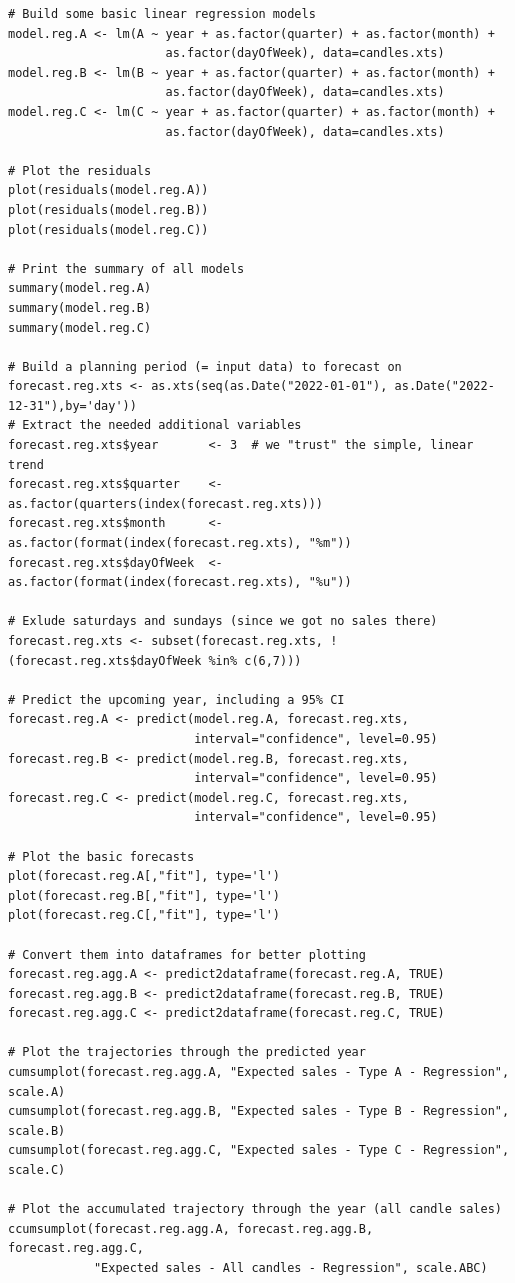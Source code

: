 \documentclass[a4paper,11pt]{article}
\begin{document}
\begin{lstlisting}
# Build some basic linear regression models
model.reg.A <- lm(A ~ year + as.factor(quarter) + as.factor(month) +
                      as.factor(dayOfWeek), data=candles.xts)
model.reg.B <- lm(B ~ year + as.factor(quarter) + as.factor(month) +
                      as.factor(dayOfWeek), data=candles.xts)
model.reg.C <- lm(C ~ year + as.factor(quarter) + as.factor(month) +
                      as.factor(dayOfWeek), data=candles.xts)

# Plot the residuals
plot(residuals(model.reg.A))
plot(residuals(model.reg.B))
plot(residuals(model.reg.C))

# Print the summary of all models
summary(model.reg.A)
summary(model.reg.B)
summary(model.reg.C)

# Build a planning period (= input data) to forecast on
forecast.reg.xts <- as.xts(seq(as.Date("2022-01-01"), as.Date("2022-12-31"),by='day'))
# Extract the needed additional variables
forecast.reg.xts$year       <- 3  # we "trust" the simple, linear trend
forecast.reg.xts$quarter    <- as.factor(quarters(index(forecast.reg.xts)))
forecast.reg.xts$month      <- as.factor(format(index(forecast.reg.xts), "%m"))
forecast.reg.xts$dayOfWeek  <- as.factor(format(index(forecast.reg.xts), "%u"))

# Exlude saturdays and sundays (since we got no sales there)
forecast.reg.xts <- subset(forecast.reg.xts, !(forecast.reg.xts$dayOfWeek %in% c(6,7)))

# Predict the upcoming year, including a 95% CI
forecast.reg.A <- predict(model.reg.A, forecast.reg.xts,
                          interval="confidence", level=0.95)
forecast.reg.B <- predict(model.reg.B, forecast.reg.xts,
                          interval="confidence", level=0.95)
forecast.reg.C <- predict(model.reg.C, forecast.reg.xts,
                          interval="confidence", level=0.95)

# Plot the basic forecasts
plot(forecast.reg.A[,"fit"], type='l')
plot(forecast.reg.B[,"fit"], type='l')
plot(forecast.reg.C[,"fit"], type='l')

# Convert them into dataframes for better plotting
forecast.reg.agg.A <- predict2dataframe(forecast.reg.A, TRUE)
forecast.reg.agg.B <- predict2dataframe(forecast.reg.B, TRUE)
forecast.reg.agg.C <- predict2dataframe(forecast.reg.C, TRUE)

# Plot the trajectories through the predicted year
cumsumplot(forecast.reg.agg.A, "Expected sales - Type A - Regression", scale.A)
cumsumplot(forecast.reg.agg.B, "Expected sales - Type B - Regression", scale.B)
cumsumplot(forecast.reg.agg.C, "Expected sales - Type C - Regression", scale.C)

# Plot the accumulated trajectory through the year (all candle sales)
ccumsumplot(forecast.reg.agg.A, forecast.reg.agg.B, forecast.reg.agg.C,
            "Expected sales - All candles - Regression", scale.ABC)
\end{lstlisting}
\end{document}
